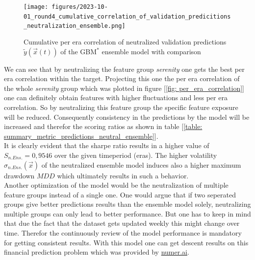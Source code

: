 \documentclass[12pt, a4paper]{article}
\begin{document}
\begin{figure}[!htpb]
    \centering
    \texttt{[image: figures/2023-10-01\_round4\_cumulative\_correlation\_of\_validation\_predicitions\_neutralization\_ensemble.png]}
    \caption[Cumulative per era correlation of neutralized predictions of the GBM$^{\ast}$ ensemble model with comparison]{Cumulative per era correlation of neutralized validation predictions $\tilde{y}(\vec{x}(t))$ of the GBM$^{\ast}$ ensemble model with comparison}
    \label{fig: cum_corr_val_preds_ensemble_neutral}    
\end{figure}
We can see that by neutralizing the feature group \textit{serenity} one gets the best per era correlation within the target. Projecting this one the per era correlation of the whole \textit{serenity} group which was plotted in figure [\ref{fig: per_era_correlation}] one can definitely obtain features with higher fluctuations and less per era correlation. So by neutralizing this feature group the specific feature exposure will be reduced. Consequently consistency in the predictions by the model will be increased and therefor the scoring ratios as shown in table [\ref{table: summary_metric_predictions_neutral_ensemble}]. \\
It is clearly evident that the sharpe ratio results in a higher value of $S_{n.Ens.} = 0,9546$ over the given timeperiod (eras). The higher volatility $\sigma_{n.Ens.}(\vec{x})$ of the neutralized ensemble model induces also a higher maximum drawdown $MDD$ which ultimately results in such a behavior. \\
Another optimization of the model would be the neutralization of multiple feature groups instead of a single one. One would argue that if two seperated groups give better predictions results than the ensemble model solely, neutralizing multiple groups can only lead to better performance. 
\newpage 
But one has to keep in mind that due the fact that the dataset gets updated weekly this might change over time. Therefor the continuously review of the model performance is mandatory for getting consistent results.
With this model one can get descent results on this financial prediction problem which was provided by \href{https://numer.ai}{numer.ai}. 
\end{document}
